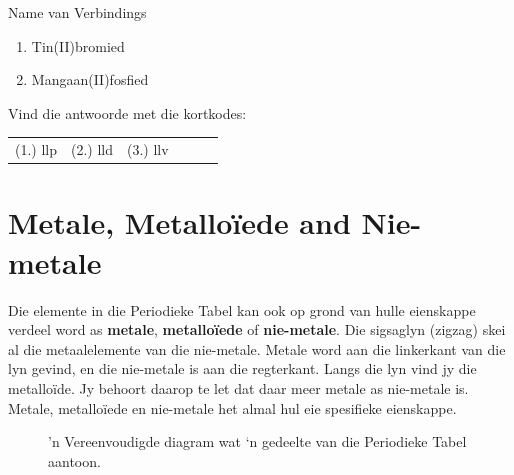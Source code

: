 \begin{exercises}{Name van Verbindings}
{\begin{enumerate}[noitemsep, label=\textbf{\arabic*}. ]
\begin{enumerate}[noitemsep, label=\textbf{\alph*}. ]
\item Tin(II)bromied
\item Mangaan(II)fosfied
\end{enumerate}
\end{enumerate}
    \label{m38708*cid5}
\par {} Vind die antwoorde met die kortkodes:
 \par \begin{tabular}[h]{cccccc}
 (1.) llp  &  (2.) lld  &  (3.) llv   & & \end{tabular}}
\end{exercises}
            \section{Metale, Metallo\"iede and Nie-metale}
            \nopagebreak
      \label{m38708*id65693}Die elemente in die Periodieke Tabel kan ook op grond van hulle eienskappe verdeel word as \textbf{metale}, \textbf{metallo\"iede} of \textbf{nie-metale}. Die sigsaglyn (zigzag) skei al die metaalelemente van die nie-metale. Metale word aan die linkerkant van die lyn gevind, en die nie-metale is aan die regterkant. Langs die lyn vind jy die metalloïde. Jy behoort daarop te let dat daar meer metale as nie-metale is. Metale, metalloïede en nie-metale het almal hul eie spesifieke eienskappe.\par 
\begin{figure}[h]

\begin{center}
\end{center}
\caption{'n Vereenvoudigde diagram wat ‘n gedeelte van die Periodieke Tabel aantoon.}
\label{fig:periodic}
\end{figure} \vspace{-.5cm}
      \label{m38708*uid76}
